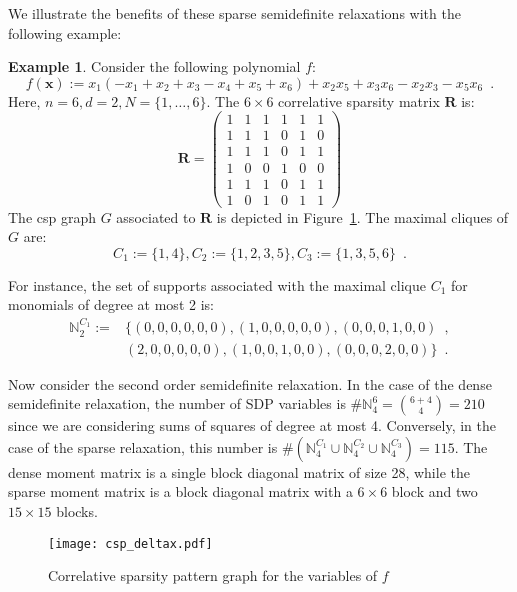 \documentclass[a4paper,10pt]{article}
\newcommand{\mons}[2]{\N_{#1}^{#2}}
\newcommand{\N}{\mathbb{N}}
\newcommand{\x}{\mathbf{x}}
\theoremstyle{plain}
\theoremstyle{definition}
\newtheorem{example}{Example}
\theoremstyle{remark}
\begin{document}
We illustrate the benefits of these sparse semidefinite relaxations with the following example:
\begin{example}
\label{ex:sparse}
Consider the following polynomial $f$:
\[ f(\x) := x_1 ( - x_1 +  x_2 +  x_3  - x_4 +  x_5 +  x_6) 
+ x_2 x_5 + x_3 x_6 - x_2 x_3  - x_5 x_6\enspace. \] 
Here, $n = 6, d = 2, N = \{1,\dots, 6 \}$. The $6 \times 6$ correlative sparsity matrix $\mathbf{R}$ is:
\[
\mathbf{R} = 
\begin{pmatrix}
  1 & 1 & 1 & 1 & 1 & 1 \\
  1 & 1 & 1 & 0 & 1 & 0 \\
  1 & 1 & 1 & 0 & 1 & 1 \\
  1 & 0 & 0 & 1 & 0 & 0 \\
  1 & 1 & 1 & 0 & 1 & 1 \\
  1 & 0 & 1 & 0 & 1 & 1 
 \end{pmatrix}
\]
The csp graph $G$ associated to $\mathbf{R}$ is depicted in Figure~\ref{fig:csp_deltax}. The maximal cliques of $G$ are:
\[ C_1 := \{1, 4\}, C_2 := \{1, 2, 3, 5\}, C_3 := \{1, 3, 5, 6\}\enspace. \]

For instance, the set of supports associated with the maximal clique $C_1$ for monomials of degree at most 2 is:
\begin{align*}
\mons{2}{C_1} := & \{ (0, 0, 0, 0, 0, 0), (1, 0, 0, 0, 0, 0),  (0, 0, 0, 1, 0, 0)\enspace, \\
                &(2, 0, 0, 0, 0, 0), (1, 0, 0, 1, 0, 0), (0, 0, 0, 2, 0, 0) \}\enspace. 
\end{align*}

Now consider the second order semidefinite relaxation. In the case of the dense semidefinite relaxation, the number of SDP variables is $\#\mons{4}{6} = \binom{6 + 4}{4} = 210$ since we are considering sums of squares of degree at most 4.
Conversely, in the case of the sparse relaxation, this number is $\#( \mons{4}{C_1} \cup \mons{4}{C_2} \cup \mons{4}{C_3}) = 115 $. The dense moment matrix is a single block diagonal matrix of size 28, while the sparse moment matrix is a block diagonal matrix with a $6 \times 6$ block and two $15 \times 15$ blocks.


\begin{figure}[!ht]	
\begin{center}
\texttt{[image: csp\_deltax.pdf]}
\caption{Correlative sparsity pattern graph for the variables of $f$}
\label{fig:csp_deltax}
\end{center}
\end{figure}
\end{example}
\end{document}
